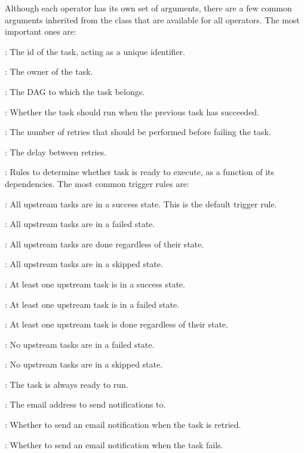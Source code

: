 Although each operator has its own set of arguments, there are a few common arguments inherited from the
 class that are available for all operators. The most important ones are:
\bit
\item {}: The id of the task, acting as a unique identifier.
\item {}: The owner of the task.
\item {}: The DAG to which the task belongs.
\item {}: Whether the task should run when the previous task has succeeded.
\item {}: The number of retries that should be performed before failing the task.
\item {}: The delay between retries.
\item {}: Rules to determine whether task is ready to execute, as a function of its dependencies. The
most common trigger rules are:
\bit
\item {}: All upstream tasks are in a success state. This is the default trigger rule.
\item {}: All upstream tasks are in a failed state.
\item {}: All upstream tasks are done regardless of their state.
\item {}: All upstream tasks are in a skipped state.
\item {}: At least one upstream task is in a success state.
\item {}: At least one upstream task is in a failed state.
\item {}: At least one upstream task is done regardless of their state.
\item {}: No upstream tasks are in a failed state.
\item {}: No upstream tasks are in a skipped state.
\item {}: The task is always ready to run.
\eit
\item {}: The email address to send notifications to.
\item {}: Whether to send an email notification when the task is retried.
\item {}: Whether to send an email notification when the task fails.
\eit

